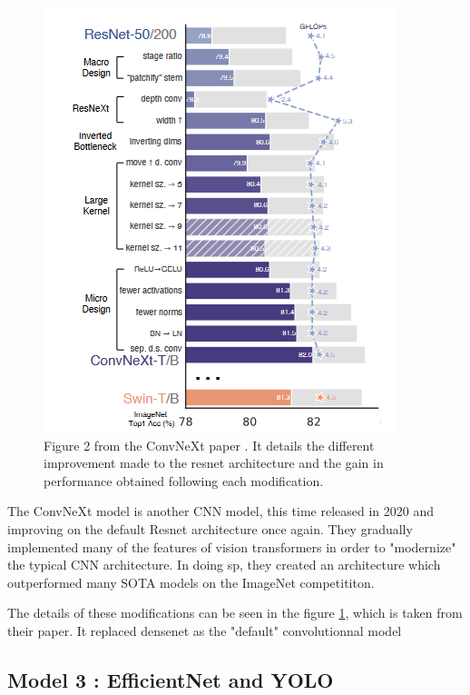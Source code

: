 \documentclass[11pt]{article}
\begin{document}
\begin{figure}[h]

     \centering
     \includegraphics[width=0.8 \textwidth]{plots/convnext_graph}
     \caption{Figure 2 from the ConvNeXt paper \cite{convnext}. It details the different improvement made to the
     resnet architecture and the gain in performance obtained following each modification.}
     \label{fig:convnext}

\end{figure}

        The ConvNeXt model is another CNN model, this time released in 2020 and improving on the default Resnet architecture once again.
        They gradually implemented many of the features of vision transformers in order to "modernize" the typical CNN architecture. In doing sp,
        they created an architecture which outperformed many SOTA models on the ImageNet competititon.

        The details of these modifications can be seen in the figure \ref{fig:convnext}, which is taken from their paper.
        It replaced densenet as the "default" convolutionnal model


    \subsection{Model 3 : EfficientNet \cite{efficientnet} and YOLO \cite{yolo}}
\end{document}
